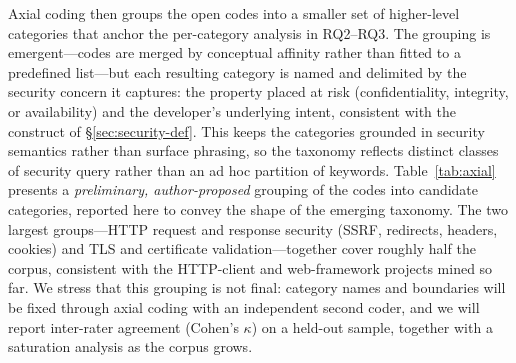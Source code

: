 Axial coding then groups the open codes into a smaller set of higher-level
categories that anchor the per-category analysis in RQ2--RQ3. The grouping is
emergent---codes are merged by conceptual affinity rather than fitted to a
predefined list---but each resulting category is named and delimited by the
security concern it captures: the property placed at risk (confidentiality,
integrity, or availability) and the developer's underlying intent, consistent
with the construct of \S\ref{sec:security-def}. This keeps the categories
grounded in security semantics rather than surface phrasing, so the taxonomy
reflects distinct classes of security query rather than an ad hoc partition of
keywords. Table~\ref{tab:axial} presents a \emph{preliminary, author-proposed}
grouping of the  codes into  candidate categories,
reported here to convey the shape of the emerging taxonomy. The two largest
groups---HTTP request and response security (SSRF, redirects, headers, cookies)
and TLS and certificate validation---together cover roughly half the corpus,
consistent with the HTTP-client and web-framework projects mined so far. We
stress that this grouping is not final: category names and boundaries will be
fixed through axial coding with an independent second coder, and we will report
inter-rater agreement (Cohen's $\kappa$) on a held-out sample, together with a
saturation analysis as the corpus grows.




